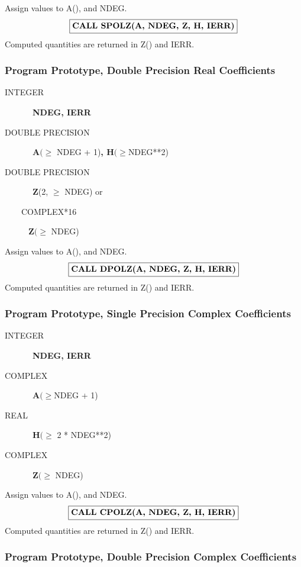 \documentclass[twoside]{MATH77}
\begin{document}
Assign values to A(), and NDEG.%
$$
\fbox{{\bf CALL SPOLZ(A, NDEG, Z, H, IERR)}}
$$
Computed quantities are returned in Z() and IERR.

\subsubsection{Program Prototype, Double Precision Real Coefficients}

\begin{description}
\item[INTEGER]  \ {\bf NDEG, IERR}

\item[DOUBLE PRECISION]  \ {\bf A}$(\geq $ NDEG + 1){\bf ,\newline
H}$(\geq $NDEG**2)

\item[DOUBLE PRECISION]  \ {\bf Z}(2, $\geq $ NDEG) or

\item[~~~~COMPLEX*16]  {\bf Z}$(\geq $ NDEG)
\end{description}

Assign values to A(), and NDEG.%
$$
\fbox{{\bf CALL DPOLZ(A, NDEG, Z, H, IERR)}}
$$
Computed quantities are returned in Z() and IERR.

\subsubsection{Program Prototype, Single Precision Complex Coefficients}

\begin{description}
\item[INTEGER]  \ {\bf NDEG, IERR}

\item[COMPLEX]  \ {\bf A}$(\geq $NDEG + 1)

\item[REAL]  \ {\bf H}$(\geq $ 2 * NDEG**2)

\item[COMPLEX]  \ {\bf Z}$(\geq $ NDEG)
\end{description}

Assign values to A(), and NDEG.%
$$
\fbox{{\bf CALL CPOLZ(A, NDEG, Z, H, IERR)}}
$$
Computed quantities are returned in Z() and IERR.

\subsubsection{Program Prototype, Double Precision Complex Coefficients}
\end{document}
